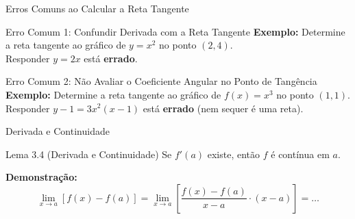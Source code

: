 \documentclass[10pt, aspectratio=169]{beamer}
\begin{document}
\begin{frame}{Erros Comuns ao Calcular a Reta Tangente}
  \begin{alertblock}{Erro Comum 1: Confundir Derivada com a Reta Tangente}
    \textbf{Exemplo:} Determine a reta tangente ao gráfico de $y = x^2$ no ponto $(2, 4)$.\\
    Responder $y = 2x$ está \textbf{errado}.
  \end{alertblock}

  \begin{alertblock}{Erro Comum 2: Não Avaliar o Coeficiente Angular no Ponto de Tangência}
    \textbf{Exemplo:} Determine a reta tangente ao gráfico de $f(x) = x^3$ no ponto $(1, 1)$.\\
    Responder $y - 1 = 3x^2(x - 1)$ está \textbf{errado} (nem sequer é uma reta).
  \end{alertblock}
\end{frame}

\begin{frame}{Derivada e Continuidade}
  \begin{block}{Lema 3.4 (Derivada e Continuidade)}
    Se $f'(a)$ existe, então $f$ é contínua em $a$.
  \end{block}

  \vspace{0.4cm}
  \textbf{Demonstração:}
  \[
    \lim_{x \to a} [f(x) - f(a)] = \lim_{x \to a} \left[ \frac{f(x) - f(a)}{x - a} \cdot (x - a) \right] = \dots
  \]
\end{frame}
\end{document}
